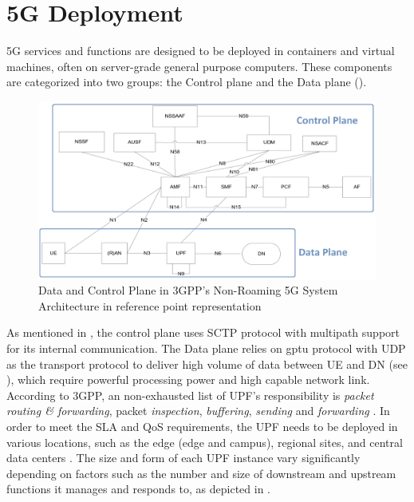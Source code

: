 \section{5G Deployment}
5G services and functions are designed to be deployed in containers and virtual machines, often on server-grade general purpose computers.
These components are categorized into two groups: the Control plane and the Data plane ().

\begin{figure}[H]
	\centering
	\includegraphics[width=1.0\textwidth]{resources/images/Non_Roaming_5G_System_Architecture_in_reference_point_representation.png}
	\caption{Data and Control Plane in 3GPP's Non-Roaming 5G System Architecture in reference point representation \cite{3gpp_5g_system_architect_spec_release_18}}
	\label{fig:related_work:Non_Roaming_5G_System_Architecture_in_reference_point_representation}
\end{figure}

As mentioned in , the control plane uses \ac{SCTP} protocol with multipath support for its internal communication.
The Data plane relies on \ac{gptu} protocol with \ac{UDP} as the transport protocol to deliver high volume of data between \ac{UE} and \ac{DN} (see ), which require powerful processing power and high capable network link.
According to \ac{3GPP}, an non-exhausted list of \ac{UPF}'s responsibility is \textit{packet routing \& forwarding}, packet \textit{inspection}, \textit{buffering}, \textit{sending} and \textit{forwarding} \cite{3gpp_5g_system_architect_spec_release_18}.
In order to meet the \ac{SLA} and \ac{QoS} requirements, the \ac{UPF} needs to be deployed in various locations, such as the edge (edge and campus), regional sites, and central data centers \cite{zte_upf_full_whitepaper}. 
The size and form of each \ac{UPF} instance vary significantly depending on factors such as the number and size of downstream and upstream functions it manages and responds to, as depicted in .

